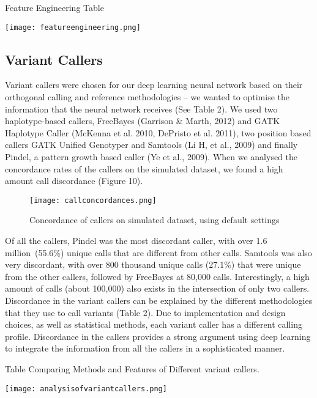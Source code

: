 \documentclass{article}
\begin{document}
\begin{table}[H]
\caption{Feature Engineering Table}
\texttt{[image: featureengineering.png]}
\centering
\end{table}
\subsection{Variant Callers}
Variant callers were chosen for our deep learning neural network based on their orthogonal calling and reference methodologies -- we wanted to optimise the information that the neural network receives (See Table 2). We used two haplotype-based callers, FreeBayes (Garrison \& Marth, 2012) and GATK Haplotype Caller (McKenna et al. 2010, DePristo et al. 2011), two position based callers GATK Unified Genotyper and Samtools (Li H, et al., 2009) and finally Pindel, a pattern growth based caller (Ye et al., 2009). When we analysed the concordance rates of the callers on the simulated dataset, we found a high amount call discordance (Figure 10).
\begin{figure}[H]
\texttt{[image: callconcordances.png]}
\centering
\caption{Concordance of callers on simulated dataset, using default settings}
\end{figure} 
Of all the callers, Pindel was the most discordant caller, with over 1.6 million\ (55.6\%) unique calls that are different from other calls. Samtools was also very discordant, with over 800 thousand unique calls (27.1\%) that were unique from the other callers, followed by FreeBayes at 80,000 calls. Interestingly, a high amount of calls (about 100,000) also exists in the intersection of only two callers. Discordance in the variant callers can be explained by the different methodologies that they use to call variants (Table 2). Due to implementation and design choices, as well as statistical methods, each variant caller has a different calling profile. Discordance in the callers provides a strong argument using deep learning to integrate the information from all the callers in a sophisticated manner.\\

\begin{table}[H]
\caption{Table Comparing Methods and Features of Different variant callers.}
\texttt{[image: analysisofvariantcallers.png]}
\centering
\end{table}
\end{document}
